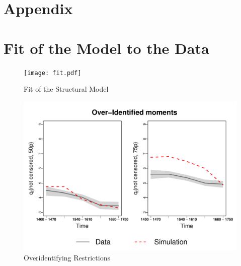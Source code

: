 \documentclass[12pt]{article}
\begin{document}



\appendix
\section*{Appendix}

\section{Fit of the Model to the Data}\label{appendix:a}
\begin{figure}[htpb]
\centering
\texttt{[image: fit.pdf]}
\caption{Fit of the Structural Model}
\label{fig:fit}
\end{figure}


\begin{figure}[htbp]
\centering
\includegraphics[width=.7\textwidth]{over.pdf}
\caption{Overidentifying Restrictions}
\label{fig:over}
\end{figure}

\FloatBarrier
\end{document}
